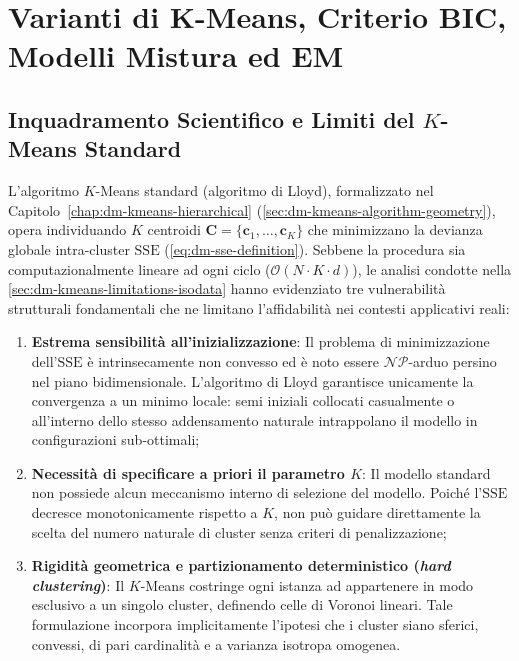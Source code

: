\chapter{Varianti di K-Means, Criterio BIC, Modelli Mistura ed EM}
\label{chap:dm-kmeans-variants-bic-em}

\section{Inquadramento Scientifico e Limiti del \texorpdfstring{$K$}{K}-Means Standard}
\label{sec:dm-kmeans-limits}

L'algoritmo $K$-Means standard (algoritmo di Lloyd), formalizzato nel Capitolo~\ref{chap:dm-kmeans-hierarchical} (\autoref{sec:dm-kmeans-algorithm-geometry}), opera individuando $K$ centroidi $\mathbf{C} = \{\mathbf{c}_1, \dots, \mathbf{c}_K\}$ che minimizzano la devianza globale intra-cluster $\mathrm{SSE}$ (\autoref{eq:dm-sse-definition}). Sebbene la procedura sia computazionalmente lineare ad ogni ciclo ($\mathcal{O}(N \cdot K \cdot d)$), le analisi condotte nella \autoref{sec:dm-kmeans-limitations-isodata} hanno evidenziato tre vulnerabilità strutturali fondamentali che ne limitano l'affidabilità nei contesti applicativi reali:

\begin{enumerate}
    \item \textbf{Estrema sensibilità all'inizializzazione}: Il problema di minimizzazione dell'$\mathrm{SSE}$ è intrinsecamente non convesso ed è noto essere $\mathcal{NP}$-arduo persino nel piano bidimensionale. L'algoritmo di Lloyd garantisce unicamente la convergenza a un minimo locale: semi iniziali collocati casualmente o all'interno dello stesso addensamento naturale intrappolano il modello in configurazioni sub-ottimali;
    \item \textbf{Necessità di specificare a priori il parametro $K$}: Il modello standard non possiede alcun meccanismo interno di selezione del modello. Poiché l'$\mathrm{SSE}$ decresce monotonicamente rispetto a $K$, non può guidare direttamente la scelta del numero naturale di cluster senza criteri di penalizzazione;
    \item \textbf{Rigidità geometrica e partizionamento deterministico (\textit{hard clustering})}: Il $K$-Means costringe ogni istanza ad appartenere in modo esclusivo a un singolo cluster, definendo celle di Voronoi lineari. Tale formulazione incorpora implicitamente l'ipotesi che i cluster siano sferici, convessi, di pari cardinalità e a varianza isotropa omogenea.
\end{enumerate}


